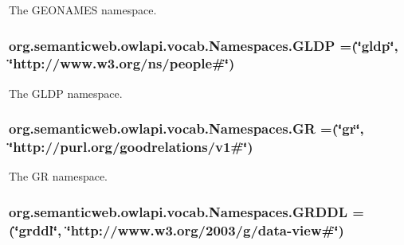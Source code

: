 The G\-E\-O\-N\-A\-M\-E\-S namespace. \hypertarget{enumorg_1_1semanticweb_1_1owlapi_1_1vocab_1_1_namespaces_aff32223f827da7a1a248167e9bd140a8}{
\subsubsection[{G\-L\-D\-P}]{\setlength{\rightskip}{0pt plus 5cm}org.\-semanticweb.\-owlapi.\-vocab.\-Namespaces.\-G\-L\-D\-P =(\char`\"{}gldp\char`\"{}, \char`\"{}http\-://www.\-w3.\-org/{\bf ns}/people\#\char`\"{})}}\label{enumorg_1_1semanticweb_1_1owlapi_1_1vocab_1_1_namespaces_aff32223f827da7a1a248167e9bd140a8}
The G\-L\-D\-P namespace. \hypertarget{enumorg_1_1semanticweb_1_1owlapi_1_1vocab_1_1_namespaces_ad53b1fc321c75687635f15521e7031bd}{
\subsubsection[{G\-R}]{\setlength{\rightskip}{0pt plus 5cm}org.\-semanticweb.\-owlapi.\-vocab.\-Namespaces.\-G\-R =(\char`\"{}gr\char`\"{}, \char`\"{}http\-://purl.\-org/goodrelations/v1\#\char`\"{})}}\label{enumorg_1_1semanticweb_1_1owlapi_1_1vocab_1_1_namespaces_ad53b1fc321c75687635f15521e7031bd}
The G\-R namespace. \hypertarget{enumorg_1_1semanticweb_1_1owlapi_1_1vocab_1_1_namespaces_ab7cd228d53119ae4758c2a74c9709fe1}{
\subsubsection[{G\-R\-D\-D\-L}]{\setlength{\rightskip}{0pt plus 5cm}org.\-semanticweb.\-owlapi.\-vocab.\-Namespaces.\-G\-R\-D\-D\-L =(\char`\"{}grddl\char`\"{}, \char`\"{}http\-://www.\-w3.\-org/2003/g/data-\/view\#\char`\"{})}}\label{enumorg_1_1semanticweb_1_1owlapi_1_1vocab_1_1_namespaces_ab7cd228d53119ae4758c2a74c9709fe1}
